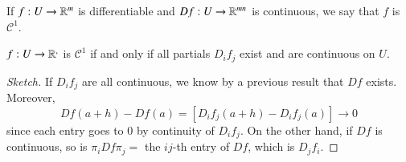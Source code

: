 \begin{definition}
    If $f:U\rightarrow \mathbb R^m$ is differentiable and $Df:U\rightarrow \mathbb R^{mn}$ is continuous, we say that $f$ is $\mathcal{C}^1$.
\end{definition}

\begin{lemma}
    $f:U\rightarrow \mathbb R^,$ is $\mathcal{C}^1$ if and only if all partials $D_if_j$ exist and are continuous on $U$.
\end{lemma}
\begin{proof}[Sketch]
    If $D_if_j$ are all continuous, we know by a previous result that $Df$ exists. Moreover, $$Df(a+h) - Df(a) = [D_if_j(a+h)-D_if_j(a)]\rightarrow 0$$ since each entry goes to $0$ by continuity of $D_if_j$. On the other hand, if $Df$ is continuous, so is $\pi_iDf\pi_j = $ the $ij$-th entry of $Df$, which is $D_jf_i$.
\end{proof}

